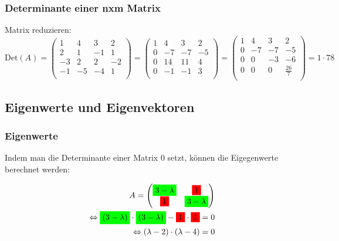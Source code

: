 \subsubsection{Determinante einer nxm Matrix}
Matrix reduzieren:
\[ \text{Det}(A) =
  \begin{pmatrix}
    1 & 4 & 3 & 2 \\
    2 & 1 & -1 & 1 \\
    -3 & 2 & 2 & -2 \\
    -1 & -5 & -4 & 1 \\
  \end{pmatrix} 
  =
  \begin{pmatrix}
    1 & 4 & 3 & 2 \\
    0 & -7 & -7 & -5 \\
    0 & 14 & 11 & 4 \\
    0 & -1 & -1 & 3 \\
  \end{pmatrix} 
  =
  \begin{pmatrix}
    1 & 4 & 3 & 2 \\
    0 & -7 & -7 & -5 \\
    0 & 0 & -3 & -6 \\
    0 & 0 & 0 & \frac{26}{7} \\
  \end{pmatrix} 
  = 1 \cdot 78
\]

\subsection{Eigenwerte und Eigenvektoren}

\subsubsection{Eigenwerte}
Indem man die Determinante einer Matrix $ 0 $ setzt, können die Eigegenwerte berechnet werden:

\begin{align*}
  A =
  \begin {pmatrix}
    \colorbox{green}{$3 - \lambda$} & \colorbox{red}{1} \\
    \colorbox{red}{1} & \colorbox{green}{$3 - \lambda$} \\
  \end {pmatrix}
  \\ \Leftrightarrow \colorbox{green}{$(3 - \lambda)$} \cdot \colorbox{green}{$(3 - \lambda)$} - \colorbox{red}{1} \cdot \colorbox{red}{1} = 0
  \\ \Leftrightarrow (\lambda - 2) \cdot (\lambda - 4) = 0
\end{align*}

